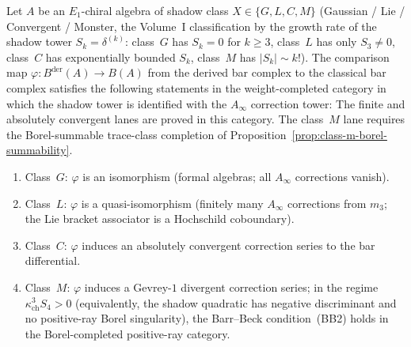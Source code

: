 \begin{proposition}
\label{prop:shadow-class-derived}
Let $A$ be an $E_1$-chiral algebra of shadow class $X \in
\{G, L, C, M\}$ \textup{(}Gaussian / Lie / Convergent / Monster, the
Volume~I classification by the growth rate of the shadow tower
$S_k = \delta^{(k)}$: class~$G$ has $S_k = 0$ for $k \geq 3$,
class~$L$ has only $S_3 \neq 0$, class~$C$ has exponentially
bounded $S_k$, class~$M$ has $|S_k| \sim k!$\textup{)}. The
comparison map $\varphi \colon B^{\mathrm{der}}(A) \to B(A)$ from
the derived bar complex to the classical bar complex satisfies the
following statements in the weight-completed category in which the
shadow tower is identified with the $A_\infty$ correction tower:
The finite and absolutely convergent lanes are proved in this category. The class~$M$ lane requires the Borel-summable trace-class completion of Proposition~\ref{prop:class-m-borel-summability}.
\begin{enumerate}[label=\textup{(\roman*)}]
 \item Class~$G$: $\varphi$ is an isomorphism (formal algebras;
 all $A_\infty$ corrections vanish).
 \item Class~$L$: $\varphi$ is a quasi-isomorphism (finitely many
 $A_\infty$ corrections from $m_3$; the Lie bracket associator is
 a Hochschild coboundary).
 \item Class~$C$: $\varphi$ induces an absolutely convergent
 correction series to the bar differential.
 \item Class~$M$: $\varphi$ induces a Gevrey-$1$ divergent correction
 series; in the regime $\kappa_{\mathrm{ch}}^3S_4>0$
 \textup{(}equivalently, the shadow quadratic has negative
 discriminant and no positive-ray Borel singularity\textup{)}, the
 Barr--Beck condition~(BB2) holds in the Borel-completed
 positive-ray category.
\end{enumerate}
\end{proposition}

